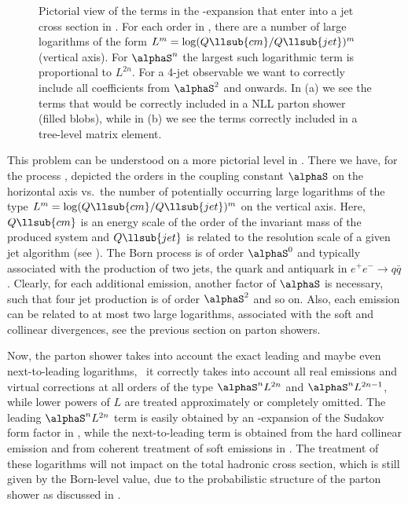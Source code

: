 \begin{figure}
\begin{center}
\hfil{}\hfil{}\hfil
  \caption{Pictorial view of the terms in the \alphaS-expansion that
  enter into a jet cross section in \lleetoj. For each order in \alphaS,
  there are a number of large logarithms of the form
  $L^m=\log({Q\llsub{cm}/Q\llsub{jet}})^m$ (vertical axis). For
  $\alphaS^n$ the largest such logarithmic term is proportional to $L^{2n}$.
  For \eg a 4-jet observable we want to correctly include all
  coefficients from $\alphaS^2$ and onwards. In (a) we see the terms
  that would be correctly included in a NLL parton shower (filled
  blobs), while in (b) we see the terms correctly included in a
  tree-level matrix element.\label{fig:matching-ordersPS}}
\end{center}
\end{figure}
This problem can be understood on a more pictorial level in
.  There we have, for the process
\lleetoj, depicted the orders in the coupling constant $\alphaS$ on
the horizontal axis vs.\ the number of potentially occurring large
logarithms of the type $L^m=\log(Q\llsub{cm}/Q\llsub{jet})^m$ on the
vertical axis.  Here, $Q\llsub{cm}$ is an energy scale of the order of
the invariant mass of the produced system and $Q\llsub{jet}$ is
related to the resolution scale of a given jet algorithm (see
). The Born process is of order
$\alphaS^0$ and typically associated with the production of two
jets, the quark and antiquark in $e^+e^-\to q\bar q$.  Clearly, for each
additional emission, another factor of $\alphaS$ is necessary, such
that four jet production is of order $\alphaS^2$ and so on.  Also,
each emission can be related to at most two large logarithms,
associated with the soft and collinear divergences, see the previous
section on parton showers.

Now, the parton shower takes into account the exact leading and maybe
even next-to-leading logarithms, \ie\ it correctly takes into
account all real emissions and virtual corrections at all orders of
the type $\alphaS^nL^{2n}$ and $\alphaS^nL^{2n-1}$, while lower
powers of $L$ are treated approximately or
completely omitted. The leading $\alphaS^nL^{2n}$ term is easily
obtained by an \alphaS-expansion of the Sudakov form factor in
, while the next-to-leading term is obtained from the
hard collinear emission and from coherent treatment of soft emissions
in . The treatment of these
logarithms will not impact on the total hadronic cross section, which
is still given by the Born-level value, due to the probabilistic
structure of the parton shower as discussed in
.

